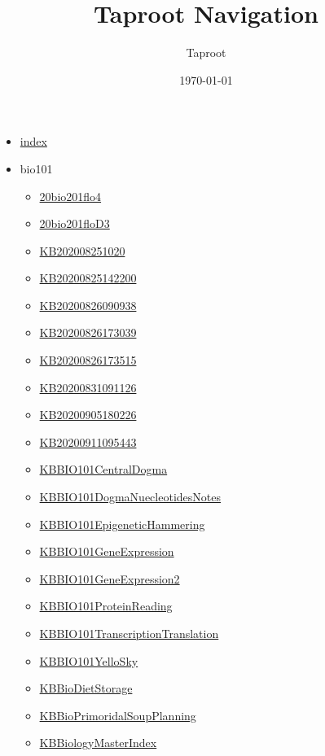 \documentclass[11pt]{article}
\author{Taproot}
\date{\today}
\title{Taproot Navigation}
\begin{document}
\maketitle
\tableofcontents

\begin{itemize}
\item \href{index.org}{index}
\item bio101
\begin{itemize}
\item \href{bio101/20bio201flo4.org}{20bio201flo4}
\item \href{bio101/20bio201floD3.org}{20bio201floD3}
\item \href{bio101/KB202008251020.org}{KB202008251020}
\item \href{bio101/KB20200825142200.org}{KB20200825142200}
\item \href{bio101/KB20200826090938.org}{KB20200826090938}
\item \href{bio101/KB20200826173039.org}{KB20200826173039}
\item \href{bio101/KB20200826173515.org}{KB20200826173515}
\item \href{bio101/KB20200831091126.org}{KB20200831091126}
\item \href{bio101/KB20200905180226.org}{KB20200905180226}
\item \href{bio101/KB20200911095443.org}{KB20200911095443}
\item \href{bio101/KBBIO101CentralDogma.org}{KBBIO101CentralDogma}
\item \href{bio101/KBBIO101DogmaNuecleotidesNotes.org}{KBBIO101DogmaNuecleotidesNotes}
\item \href{bio101/KBBIO101EpigeneticHammering.org}{KBBIO101EpigeneticHammering}
\item \href{bio101/KBBIO101GeneExpression.org}{KBBIO101GeneExpression}
\item \href{bio101/KBBIO101GeneExpression2.org}{KBBIO101GeneExpression2}
\item \href{bio101/KBBIO101ProteinReading.org}{KBBIO101ProteinReading}
\item \href{bio101/KBBIO101TranscriptionTranslation.org}{KBBIO101TranscriptionTranslation}
\item \href{bio101/KBBIO101YelloSky.org}{KBBIO101YelloSky}
\item \href{bio101/KBBioDietStorage.org}{KBBioDietStorage}
\item \href{bio101/KBBioPrimoridalSoupPlanning.org}{KBBioPrimoridalSoupPlanning}
\item \href{bio101/KBBiologyMasterIndex.org}{KBBiologyMasterIndex}

\end{itemize}
\end{itemize}
\end{document}
